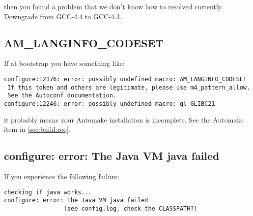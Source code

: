 \noindent
then you found a problem that we don't know how to resolved currently.
Downgrade from GCC-4.4 to GCC-4.3.

\subsection{AM\_LANGINFO\_CODESET}

If at bootstrap you have something like:

\begin{verbatim}
configure:12176: error: possibly undefined macro: AM_LANGINFO_CODESET
 If this token and others are legitimate, please use m4_pattern_allow.
 See the Autoconf documentation.
configure:12246: error: possibly undefined macro: gl_GLIBC21
\end{verbatim}

\noindent
it probably means your Automake installation is incomplete.  See the
Automake item in \autoref{sec:build:req}.


\subsection{configure: error: The Java VM java failed}
\label{sec:faq:jvm}

If you experience the following failure:

\begin{verbatim}
checking if java works...
configure: error: The Java VM java failed
                 (see config.log, check the CLASSPATH?)
\end{verbatim}

